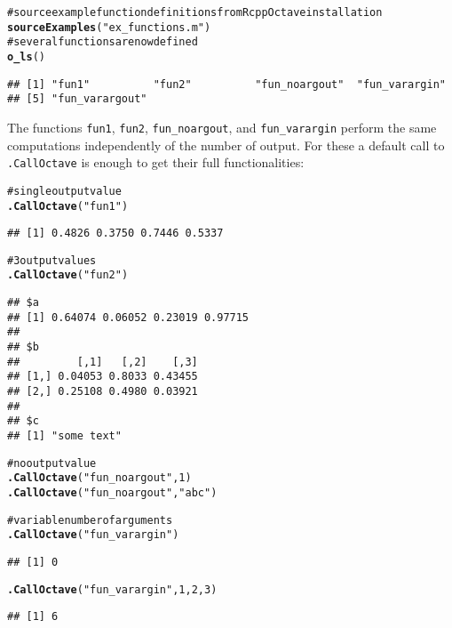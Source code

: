 \documentclass[english,10pt,a4paper]{article}\usepackage{graphicx, color}
\makeatletter
\newcommand{\hlfunctioncall}[1]{\textcolor[rgb]{0.501960784313725,0,0.329411764705882}{\textbf{#1}}}%
\newcommand{\hlstring}[1]{\textcolor[rgb]{0.6,0.6,1}{#1}}%
\newcommand{\hlcomment}[1]{\textcolor[rgb]{0.180392156862745,0.6,0.341176470588235}{#1}}%
\newenvironment{kframe}{%
 \def\at@end@of@kframe{}%
 \ifinner\ifhmode%
  \def\at@end@of@kframe{\end{minipage}}%
  \begin{minipage}{\columnwidth}%
 \fi\fi%
 \def\FrameCommand##1{\hskip\@totalleftmargin \hskip-\fboxsep
 \colorbox{shadecolor}{##1}\hskip-\fboxsep
     \hskip-\linewidth \hskip-\@totalleftmargin \hskip\columnwidth}%
 \MakeFramed {\advance\hsize-\width
   \@totalleftmargin\z@ \linewidth\hsize
   \@setminipage}}%
 {\par\unskip\endMakeFramed%
 \at@end@of@kframe}
\newenvironment{knitrout}{}{} %
\let\code=\texttt
\makeatother
\begin{document}
\begin{knitrout}
\color{fgcolor}\begin{kframe}
\begin{alltt}
\hlcomment{# source example function definitions from RcppOctave installation}
\hlfunctioncall{sourceExamples}(\hlstring{"ex_functions.m"})
\hlcomment{# several functions are now defined}
\hlfunctioncall{o_ls}()
\end{alltt}
\begin{verbatim}
## [1] "fun1"          "fun2"          "fun_noargout"  "fun_varargin" 
## [5] "fun_varargout"
\end{verbatim}
\end{kframe}
\end{knitrout}


The functions \code{fun1}, \code{fun2}, \code{fun\_noargout}, and
\code{fun\_varargin} perform the same computations independently of the number
of output.
For these a default call to \code{.CallOctave} is enough to get their full
functionalities:

\begin{knitrout}
\color{fgcolor}\begin{kframe}
\begin{alltt}
\hlcomment{# single output value}
\hlfunctioncall{.CallOctave}(\hlstring{"fun1"})
\end{alltt}
\begin{verbatim}
## [1] 0.4826 0.3750 0.7446 0.5337
\end{verbatim}
\begin{alltt}
\hlcomment{# 3 output values}
\hlfunctioncall{.CallOctave}(\hlstring{"fun2"})
\end{alltt}
\begin{verbatim}
## $a
## [1] 0.64074 0.06052 0.23019 0.97715
## 
## $b
##         [,1]   [,2]    [,3]
## [1,] 0.04053 0.8033 0.43455
## [2,] 0.25108 0.4980 0.03921
## 
## $c
## [1] "some text"
\end{verbatim}
\begin{alltt}

\hlcomment{# no output value}
\hlfunctioncall{.CallOctave}(\hlstring{"fun_noargout"}, 1)
\hlfunctioncall{.CallOctave}(\hlstring{"fun_noargout"}, \hlstring{"abc"})

\hlcomment{# variable number of arguments}
\hlfunctioncall{.CallOctave}(\hlstring{"fun_varargin"})
\end{alltt}
\begin{verbatim}
## [1] 0
\end{verbatim}
\begin{alltt}
\hlfunctioncall{.CallOctave}(\hlstring{"fun_varargin"}, 1, 2, 3)
\end{alltt}
\begin{verbatim}
## [1] 6
\end{verbatim}
\end{kframe}
\end{knitrout}
\end{document}
